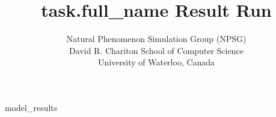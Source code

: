 \documentclass{article}
\begin{document}
\title{{{task.full_name}} Result Run}
\author{Natural Phenomenon Simulation Group (NPSG)\\David R. Chariton School of Computer Science\\University of Waterloo, Canada}

\maketitle

{{model_results}}
\end{document}
